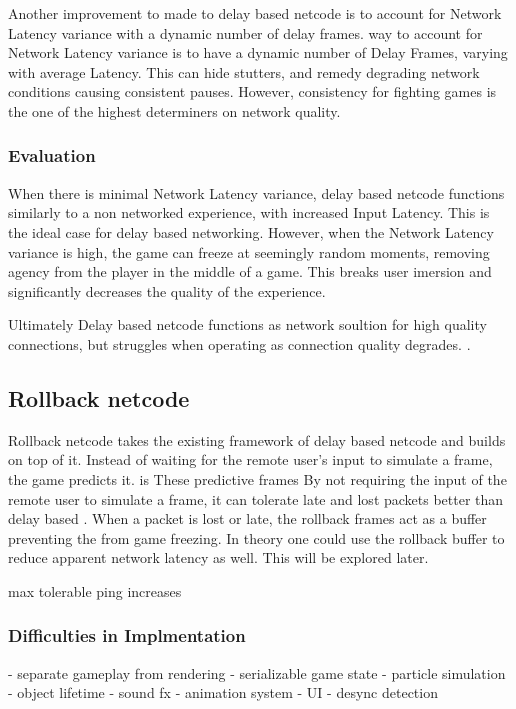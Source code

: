 \documentclass{entcs}
\begin{document}
Another improvement to made to delay based netcode is to account for Network Latency variance with a dynamic number of delay frames. way to account for Network Latency variance is to have a dynamic number of Delay Frames, varying with average Latency\cite{DelayVsRollback}. This can hide stutters, and remedy degrading network conditions causing consistent pauses. However, consistency for fighting games is the one of the highest determiners on network quality\cite{Core-ARollback}.

\subsubsection{Evaluation}
When there is minimal Network Latency variance, delay based netcode functions similarly to a non networked experience, with increased Input Latency. This is the ideal case for delay based networking. However, when the Network Latency variance is high, the game can freeze at seemingly random moments, removing agency from the player in the middle of a game. This breaks user imersion and significantly decreases the quality of the experience\cite{DelayVsRollback}.

Ultimately Delay based netcode functions as network soultion for high quality connections, but struggles when operating as connection quality degrades. \cite{KIInterview}.
\subsection{Rollback netcode}
Rollback netcode takes the existing framework of delay based netcode and builds on top of it. Instead of waiting for the remote user's input to simulate a frame, the game predicts it.  is These predictive frames By not requiring the input of the remote user to simulate a frame, it can tolerate late and lost packets better than delay based \cite{GGPODocumentation}. When a packet is lost or late, the rollback frames act as a buffer preventing the from game freezing. In theory one could use the rollback buffer to reduce apparent network latency as well. This will be explored later.


max tolerable ping increases
\subsubsection{Difficulties in Implmentation}
- separate gameplay from rendering
- serializable game state
- particle simulation 
- object lifetime 
- sound fx
- animation system
- UI
- desync detection
\end{document}
